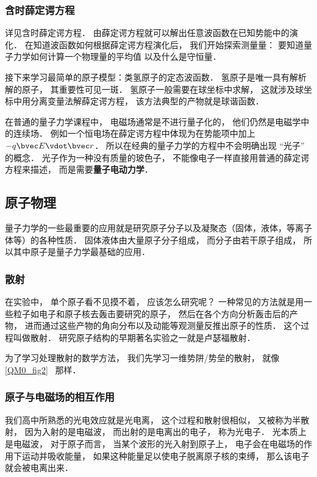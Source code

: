 \subsubsection{含时薛定谔方程}
详见含时薛定谔方程． 由薛定谔方程就可以解出任意波函数在已知势能中的演化． 在知道波函数如何根据薛定谔方程演化后， 我们开始探索测量量： 要知道量子力学如何计算一个物理量的平均值 以及什么是守恒量．

接下来学习最简单的原子模型：类氢原子的定态波函数． 氢原子是唯一具有解析解的原子， 其重要性可见一斑． 氢原子一般需要在球坐标中求解， 这就涉及球坐标中用分离变量法解薛定谔方程， 该方法典型的产物就是球谐函数．

在普通的量子力学课程中， 电磁场通常是不进行量子化的， 他们仍然是电磁学中的连续场． 例如一个恒电场在薛定谔方程中体现为在势能项中加上 $-q\bvec E \vdot \bvec r$． 所以在经典的量子力学的方程中不会明确出现 “光子” 的概念． 光子作为一种没有质量的玻色子， 不能像电子一样直接用普通的薛定谔方程来描述， 而是需要\textbf{量子电动力学}．

\subsection{原子物理}
量子力学的一些最重要的应用就是研究原子分子以及凝聚态（固体，液体，等离子体等）的各种性质． 固体液体由大量原子分子组成， 而分子由若干原子组成， 所以其中原子是量子力学最基础的应用．

\subsubsection{散射}
在实验中， 单个原子看不见摸不着， 应该怎么研究呢？ 一种常见的方法就是用一些粒子如电子和原子核去轰击要研究的原子， 然后在各个方向分析轰击后的产物， 进而通过这些产物的角向分布以及动能等观测量反推出原子的性质． 这个过程叫做散射． 研究原子结构的早期著名实验之一就是卢瑟福散射．

为了学习处理散射的数学方法， 我们先学习一维势阱/势垒的散射， 就像\autoref{QM0_fig2}~ 那样．

\subsubsection{原子与电磁场的相互作用}
我们高中所熟悉的光电效应就是光电离， 这个过程和散射很相似， 又被称为半散射， 因为入射的是电磁波， 而出射的是电离出的电子， 称为光电子． 光本质上是电磁波， 对于原子而言， 当某个波形的光入射到原子上， 电子会在电磁场的作用下运动并吸收能量， 如果这种能量足以使电子脱离原子核的束缚， 那么该电子就会被电离出来．
